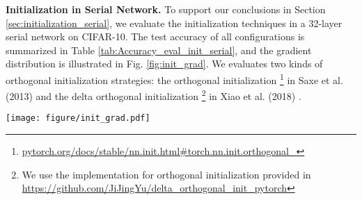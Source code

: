 \documentclass[10pt,journal,compsoc]{IEEEtran}
\begin{document}
\textbf{Initialization in Serial Network.}\label{exp:orth_init}
To support our conclusions in Section \ref{sec:initialization_serial},  we evaluate the initialization techniques in a 32-layer serial network on CIFAR-10. The test accuracy of all configurations is summarized in Table \ref{tab:Accuracy_eval_init_serial}, and the gradient distribution is illustrated in Fig. \ref{fig:init_grad}. We evaluates two kinds of orthogonal initialization strategies: the orthogonal initialization \footnote{\href{https://pytorch.org/docs/stable/nn.init.html\#torch.nn.init.orthogonal\_}{pytorch.org/docs/stable/nn.init.html\#torch.nn.init.orthogonal\_}} in Saxe et al. (2013) \cite{saxe2013exact} and the delta orthogonal initialization \footnote{We use the implementation for orthogonal initialization provided in \href{https://github.com/JiJingYu/delta\_orthogonal\_init\_pytorch}{https://github.com/JiJingYu/delta\_orthogonal\_init\_pytorch}} in Xiao et al. (2018) \cite{xiao2018dynamical}.

\begin{figure*}[ht!]
\centering
\texttt{[image: figure/init\_grad.pdf]}
\caption{Gradient norm distribution throughout the network under different configurations. The colored regions represent the range from 15 percentile to 85 percentile, while the solid line is the median. ``lReLU" denotes ``leaky ReLU".}
\label{fig:init_grad}
\vspace{-15pt}
\end{figure*}
\end{document}
